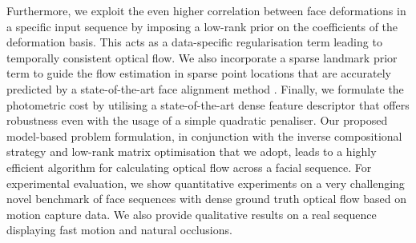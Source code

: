Furthermore, we exploit the even higher correlation between face deformations in 
a specific input sequence by imposing a low-rank prior on the coefficients of the 
deformation basis. This acts as a data-specific regularisation term leading to 
temporally consistent optical flow.
We also incorporate a sparse landmark prior term to guide the flow estimation in sparse 
point locations that are accurately predicted by a state-of-the-art face 
alignment method \cite{kazemi2014one}.
Finally, we formulate the photometric cost by utilising a state-of-the-art dense 
feature descriptor that offers robustness even with the usage of a simple quadratic 
penaliser.
Our proposed model-based problem formulation, in conjunction with the inverse 
compositional strategy and low-rank matrix optimisation that we adopt, leads to a 
highly efficient algorithm for calculating optical flow across a facial sequence.
For experimental evaluation, we show quantitative experiments on a very challenging 
novel benchmark of face sequences with dense ground truth optical flow based on motion 
capture data. We also provide qualitative results on a real sequence displaying
fast motion and natural occlusions.

\stopcontents[chapters]
